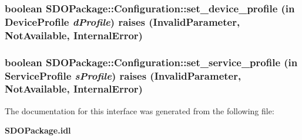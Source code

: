 \subsubsection{\setlength{\rightskip}{0pt plus 5cm}boolean SDOPackage::Configuration::set\_\-device\_\-profile (in {\bf Device\-Profile} {\em d\-Profile})  raises (Invalid\-Parameter, Not\-Available, Internal\-Error)}\label{interfaceSDOPackage_1_1Configuration_SDOPackage_1_1Configurationa0}


\subsubsection{\setlength{\rightskip}{0pt plus 5cm}boolean SDOPackage::Configuration::set\_\-service\_\-profile (in {\bf Service\-Profile} {\em s\-Profile})  raises (Invalid\-Parameter, Not\-Available, Internal\-Error)}\label{interfaceSDOPackage_1_1Configuration_SDOPackage_1_1Configurationa1}




The documentation for this interface was generated from the following file:\begin{CompactItemize}
\item 
{\bf SDOPackage.idl}\end{CompactItemize}
